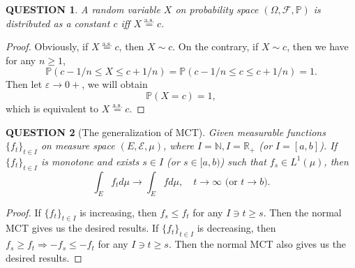 \documentclass[12pt]{article}
\renewcommand{\(}{\left(}%
\renewcommand{\)}{\right)}%
\renewcommand{\[}{\left[}%
\renewcommand{\]}{\right]}%
\renewcommand{\r}{\mathbb{R}}
\renewcommand{\ae}{\mathrm{a.s.}}
\newcommand{\p}{\mathbb{P}}
\newcommand{\n}{\mathbb{N}}
\newcommand{\f}{\mathscr{F}}
\newcommand{\e}{\mathscr{E}}
\newtheorem{question}{QUESTION}[section]}
\newtheorem{proof}{Proof.}}
\begin{document}
  \begin{question}
  	A random variable $X$ on probability space $(\Omega,\f,\p)$ is distributed as a constant $c$ iff $X\overset{\ae}{=} c$. 
  \end{question}
  \begin{proof}
  	Obviously, if $X\overset{\ae}{=} c$, then $X\sim c$. On the contrary, if $X\sim c$, then we have for any $n\geq 1$,
  	\begin{equation*}
  		\p(c-1/n\leq X\leq c+1/n)=\p(c-1/n\leq c\leq c+1/n)=1.
  	\end{equation*}
  	Then let $\varepsilon\to 0+$, we will obtain
  	\begin{equation*}
  		\p(X=c)=1,
  	\end{equation*}
  	which is equivalent to $X\overset{\ae}{=} c$.
  \end{proof}
  
  \begin{question}[The generalization of MCT]
  	Given measurable functions $\{f_t\}_{t\in I}$ on measure space $(E,\e,\mu)$, where $I=\n,I=\r_+$ (or $I=[a,b]$). If $\{f_t\}_{t\in I}$ is monotone and exists $s\in I$ (or $s\in [a,b)$) such that $f_s\in L^1(\mu)$, then 
  	\begin{equation*}
  		\int_E f_td\mu\to \int_E fd\mu,\quad t\to\infty \text{ (or }t\to b).
  	\end{equation*}
  \end{question}
  \begin{proof}
  	If $\{f_t\}_{t\in I}$ is increasing, then $f_s\leq f_t$ for any $I\ni t\geq s$. Then the normal MCT gives us the desired results. If $\{f_t\}_{t\in I}$ is decreasing, then $f_s\geq f_t\Longrightarrow -f_s\leq -f_t$ for any $I\ni t\geq s$. Then the normal MCT also gives us the desired results.
  \end{proof}
  
\end{document}
